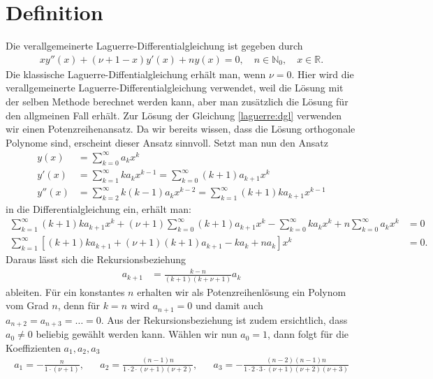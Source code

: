%
%
%
\section{Definition
  \label{laguerre:section:definition}}
Die verallgemeinerte Laguerre-Differentialgleichung ist gegeben durch
\begin{align}
x y''(x) + (\nu + 1 - x) y'(x) + n y(x)
=
0
, \quad
n \in \mathbb{N}_0
, \quad
x \in \mathbb{R}
.
\label{laguerre:dgl}
\end{align}
Die klassische Laguerre-Diffentialgleichung erhält man, wenn $\nu = 0$.
Hier wird die verallgemeinerte Laguerre-Differentialgleichung verwendet,
weil die Lösung mit der selben Methode berechnet werden kann,
aber man zusätzlich die Lösung für den allgmeinen Fall erhält.
Zur Lösung der Gleichung \eqref{laguerre:dgl} verwenden wir einen
Potenzreihenansatz.
Da wir bereits wissen, dass die Lösung orthogonale Polynome sind,
erscheint dieser Ansatz sinnvoll.
Setzt man nun den Ansatz
\begin{align*}
y(x)
 & =
\sum_{k=0}^\infty a_k x^k
\\
y'(x)
 & =
\sum_{k=1}^\infty k a_k x^{k-1}
=
\sum_{k=0}^\infty (k+1) a_{k+1} x^k
\\
y''(x)
 & =
\sum_{k=2}^\infty k (k-1) a_k x^{k-2}
=
\sum_{k=1}^\infty (k+1) k a_{k+1} x^{k-1}
\end{align*}
in die Differentialgleichung ein, erhält man:
\begin{align*}
\sum_{k=1}^\infty (k+1) k a_{k+1} x^k
+
(\nu + 1)\sum_{k=0}^\infty (k+1) a_{k+1} x^k
-
\sum_{k=0}^\infty k a_k x^k
+
n \sum_{k=0}^\infty a_k x^k
 & =
0    \\
\sum_{k=1}^\infty
\left[ (k+1) k a_{k+1} + (\nu + 1)(k+1) a_{k+1} - k a_k + n a_k \right] x^k
 & =
0.
\end{align*}
Daraus lässt sich die Rekursionsbeziehung
\begin{align*}
a_{k+1}
 & =
\frac{k-n}{(k+1) (k + \nu + 1)} a_k
\end{align*}
ableiten.
Für ein konstantes $n$ erhalten wir als Potenzreihenlösung ein Polynom vom Grad
$n$,
denn für $k=n$ wird $a_{n+1} = 0$ und damit auch $a_{n+2}=a_{n+3}=\ldots=0$.
Aus der Rekursionsbeziehung ist zudem ersichtlich,
dass $a_0 \neq 0$ beliebig gewählt werden kann.
Wählen wir nun $a_0 = 1$, dann folgt für die Koeffizienten $a_1, a_2, a_3$
\begin{align*}
a_1
=
-\frac{n}{1 \cdot (\nu + 1)}
, &  &
a_2
=
\frac{(n-1)n}{1 \cdot 2 \cdot (\nu + 1)(\nu + 2)}
, &  &
a_3
=
-\frac{(n-2)(n-1)n}{1 \cdot 2 \cdot 3 \cdot (\nu + 1)(\nu + 2)(\nu + 3)}
\end{align*}
